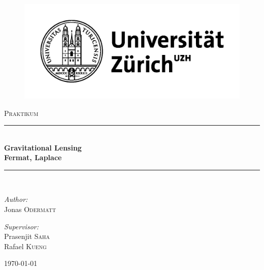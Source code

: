 \documentclass[pdftex,12pt,a4paper]{article}
\newcommand{\HRule}{\rule{\linewidth}{0.5mm}}
\begin{document}
\begin{titlepage}
\begin{center}


\begin{figure}[position=h]
\centering
 \includegraphics[width=12.5cm]{Bilder/uzhlog}%
\end{figure}



\textsc{\Large Praktikum}\\[0.5cm]

\HRule \\[0.4cm]
{ \huge \bfseries Gravitational Lensing
\\[0mm]
Fermat, Laplace}\\[0.4cm]

\HRule \\[1.5cm]

\begin{minipage}{0.4\textwidth}
\begin{flushleft} \large
\emph{Author:}\\
Jonas \textsc{Odermatt}
\end{flushleft}
\end{minipage}
\begin{minipage}{0.4\textwidth}
\begin{flushright} \large
\emph{Supervisor:} \\
Prasenjit \textsc{Saha} \\ Rafael \textsc{Kueng}
\end{flushright}
\end{minipage}

\vfill

{\large \today}

\end{center}
\end{titlepage}
\end{document}
